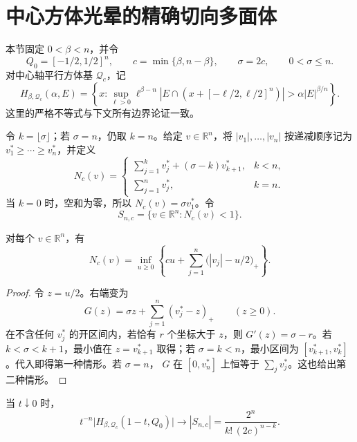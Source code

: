 \section{中心方体光晕的精确切向多面体}
\label{tan:section}

本节固定 $0<\beta<n$，并令
\[
 Q_0=[-1/2,1/2]^n,\qquad c=\min\{\beta,n-\beta\},
 \qquad \sigma=2c,\qquad 0<\sigma\le n.
\]
对中心轴平行方体基 $\mathcal Q_c$，记
\[
 H_{\beta,\mathcal Q_c}(\alpha,E)
 =\left\{x:\sup_{\ell>0}\ell^{\beta-n}
   |E\cap (x+[-\ell/2,\ell/2]^n)|>\alpha |E|^{\beta/n}\right\}.
\]
这里的严格不等式与下文所有边界论证一致。

令 $k=\lfloor\sigma\rfloor$；若 $\sigma=n$，仍取 $k=n$。给定
$v\in\mathbb R^n$，将 $|v_1|,\ldots,|v_n|$ 按递减顺序记为
$v_1^*\ge\cdots\ge v_n^*$，并定义
\begin{equation}
 N_c(v)=
 \begin{cases}
 \displaystyle\sum_{j=1}^{k}v_j^*+(\sigma-k)v_{k+1}^*,&k<n,\\[4pt]
 \displaystyle\sum_{j=1}^{n}v_j^*,&k=n.
 \end{cases}
 \label{tan:normal-form}
\end{equation}
当 $k=0$ 时，空和为零，所以 $N_c(v)=\sigma v_1^*$。令
\begin{equation}
 S_{n,c}=\{v\in\mathbb R^n:N_c(v)<1\}.
 \label{tan:polytope}
\end{equation}

\begin{lemma}[缩放参数的精确消去]
\label{tan:parameter-elimination}
对每个 $v\in\mathbb R^n$，有
\begin{equation}
 N_c(v)=\inf_{u\ge0}\left\{cu+
 \sum_{j=1}^{n}\bigl(|v_j|-u/2\bigr)_+\right\}.
 \label{tan:infimum}
\end{equation}
\end{lemma}

\begin{proof}
令 $z=u/2$。右端变为
\[
 G(z)=\sigma z+\sum_{j=1}^{n}(v_j^*-z)_+\qquad(z\ge0).
\]
在不含任何 $v_j^*$ 的开区间内，若恰有 $r$ 个坐标大于 $z$，则
$G'(z)=\sigma-r$。若 $k<\sigma<k+1$，最小值在
$z=v_{k+1}^*$ 取得；若 $\sigma=k<n$，最小区间为
$[v_{k+1}^*,v_k^*]$。代入即得第一种情形。若 $\sigma=n$，
$G$ 在 $[0,v_n^*]$ 上恒等于 $\sum_jv_j^*$。这也给出第二种情形。
\end{proof}

\begin{theorem}[单位方体的精确切向极限]
\label{tan:unit-cube-limit}
当 $t\downarrow0$ 时，
\begin{equation}
 t^{-n}\bigl|H_{\beta,\mathcal Q_c}(1-t,Q_0)\bigr|
 \longrightarrow |S_{n,c}|
 =\frac{2^n}{k!\,(2c)^{n-k}}.
 \label{tan:cube-limit}
\end{equation}
\end{theorem}

